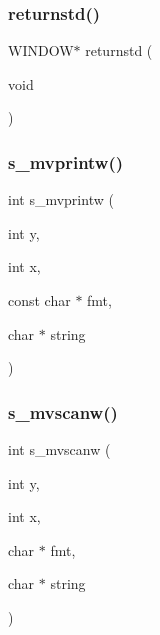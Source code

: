 \subsubsection{\texorpdfstring{returnstd()}{returnstd()}}
{\footnotesize\ttfamily W\+I\+N\+D\+OW$\ast$ returnstd (\begin{DoxyParamCaption}\item[{void}]{ }\end{DoxyParamCaption})}

\mbox{\label{C-macros_8c_a9b49cfc267a4953f8983e6e50aa43aaa}} 
\subsubsection{\texorpdfstring{s\+\_\+mvprintw()}{s\_mvprintw()}}
{\footnotesize\ttfamily int s\+\_\+mvprintw (\begin{DoxyParamCaption}\item[{int}]{y,  }\item[{int}]{x,  }\item[{const char $\ast$}]{fmt,  }\item[{char $\ast$}]{string }\end{DoxyParamCaption})}

\mbox{\label{C-macros_8c_aadefc5909b2feb200bb34f11b0dd18d1}} 
\subsubsection{\texorpdfstring{s\+\_\+mvscanw()}{s\_mvscanw()}}
{\footnotesize\ttfamily int s\+\_\+mvscanw (\begin{DoxyParamCaption}\item[{int}]{y,  }\item[{int}]{x,  }\item[{char $\ast$}]{fmt,  }\item[{char $\ast$}]{string }\end{DoxyParamCaption})}

\mbox{\label{C-macros_8c_a34a56ec22fc3813b4971c20eb6d699ff}} 

